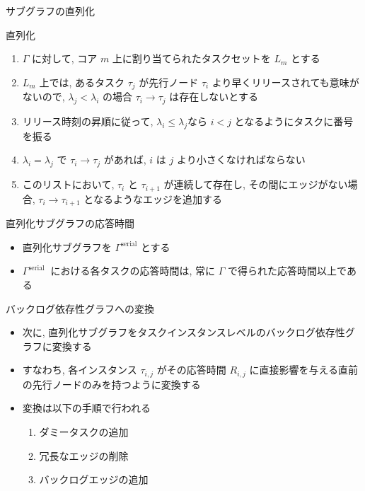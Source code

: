 \begin{frame}{サブグラフの直列化}
    \begin{block}{直列化}
        \begin{enumerate}
            \item $\Gamma$ に対して, コア $m$ 上に割り当てられたタスクセットを $L_{m}$ とする
            \item $L_{m}$ 上では, あるタスク $\tau_{j}$ が先行ノード $\tau_{i}$ より早くリリースされても意味がないので, $\lambda_{j}<\lambda_{i}$ の場合 $\tau_{i} \rightarrow \tau_{j}$ は存在しないとする
            \item リリース時刻の昇順に従って, $\lambda_{i} \leq \lambda_{j}$なら $i<j$ となるようにタスクに番号を振る
            \item $\lambda_{i}=\lambda_{j}$ で $\tau_{i} \rightarrow \tau_{j}$ があれば, $i$ は $j$ より小さくなければならない
            \item このリストにおいて, $\tau_{i}$ と $\tau_{i+1}$ が連続して存在し, その間にエッジがない場合, $\tau_{i} \rightarrow \tau_{i+1}$ となるようなエッジを追加する
        \end{enumerate}
    \end{block}
\end{frame}

\begin{frame}[label=lemma1]{直列化サブグラフの応答時間}
    \begin{lemma}[]
        \begin{itemize}
            \item 直列化サブグラフを $\Gamma^{\text {serial}}$ とする
            \item $\Gamma^{\text {serial }}$ における各タスクの応答時間は, 常に $\Gamma$ で得られた応答時間以上である
        \end{itemize}
    \end{lemma}
\end{frame}

\begin{frame}{バックログ依存性グラフへの変換}
    \begin{itemize}
        \item 次に, 直列化サブグラフをタスクインスタンスレベルのバックログ依存性グラフに変換する
        \item すなわち, 各インスタンス $\tau_{i, j}$ がその応答時間 $R_{i, j}$ に直接影響を与える直前の先行ノードのみを持つように変換する
        \item 変換は以下の手順で行われる
              \begin{enumerate}
                  \item ダミータスクの追加
                  \item 冗長なエッジの削除
                  \item バックログエッジの追加
              \end{enumerate}
    \end{itemize}
\end{frame}

